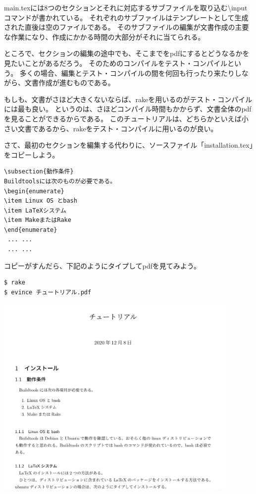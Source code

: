 main.texには8つのセクションとそれに対応するサブファイルを取り込む{\textbackslash}inputコマンドが書かれている。
それぞれのサブファイルはテンプレートとして生成された直後は空のファイルである。
そのサブファイルの編集が文書作成の主要な作業になり、作成にかかる時間の大部分がそれに当てられる。

ところで、セクションの編集の途中でも、そこまでをpdfにするとどうなるかを見たいことがあるだろう。
そのためのコンパイルをテスト・コンパイルという。
多くの場合、編集とテスト・コンパイルの間を何回も行ったり来たりしながら、文書作成が進むものである。

もしも、文書がさほど大きくないならば、rakeを用いるのがテスト・コンパイルには最も良い。
というのは、さほどコンパイル時間もかからず、文書全体のpdfを見ることができるからである。
このチュートリアルは、どちらかといえば小さい文書であるから、rakeをテスト・コンパイルに用いるのが良い。

さて、最初のセクションを編集する代わりに、ソースファイル「installation.tex」をコピーしよう。
\begin{verbatim}
\subsection{動作条件}
Buildtoolsには次のものが必要である。
\begin{enumerate}
\item Linux OS とbash
\item LaTeXシステム
\item MakeまたはRake
\end{enumerate}
 ... ...
 ... ...
\end{verbatim}
コピーがすんだら、下記のようにタイプしてpdfを見てみよう。
\begin{verbatim}
$ rake
$ evince チュートリアル.pdf
\end{verbatim}

\begin{center}
\includegraphics[width=12cm]{Tutorial_2.png}
\end{center}
